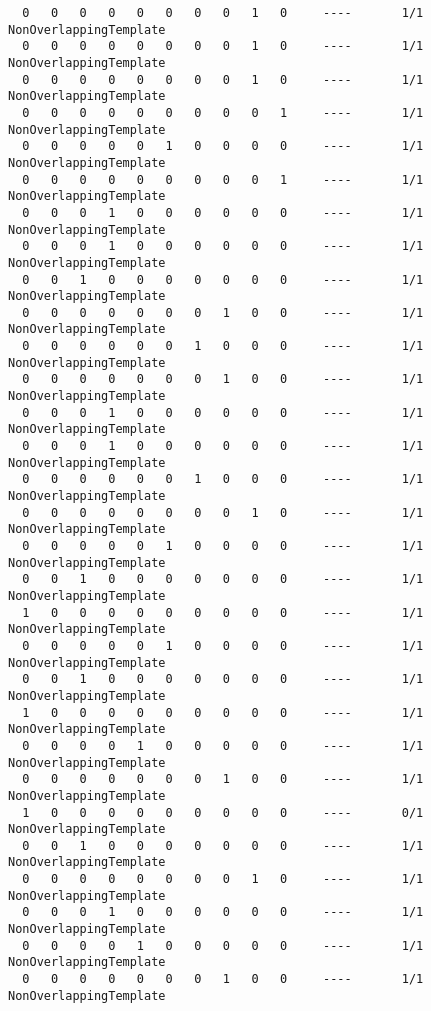 \begin{code}
\begin{verbatim}
  0   0   0   0   0   0   0   0   1   0     ----       1/1       NonOverlappingTemplate
  0   0   0   0   0   0   0   0   1   0     ----       1/1       NonOverlappingTemplate
  0   0   0   0   0   0   0   0   1   0     ----       1/1       NonOverlappingTemplate
  0   0   0   0   0   0   0   0   0   1     ----       1/1       NonOverlappingTemplate
  0   0   0   0   0   1   0   0   0   0     ----       1/1       NonOverlappingTemplate
  0   0   0   0   0   0   0   0   0   1     ----       1/1       NonOverlappingTemplate
  0   0   0   1   0   0   0   0   0   0     ----       1/1       NonOverlappingTemplate
  0   0   0   1   0   0   0   0   0   0     ----       1/1       NonOverlappingTemplate
  0   0   1   0   0   0   0   0   0   0     ----       1/1       NonOverlappingTemplate
  0   0   0   0   0   0   0   1   0   0     ----       1/1       NonOverlappingTemplate
  0   0   0   0   0   0   1   0   0   0     ----       1/1       NonOverlappingTemplate
  0   0   0   0   0   0   0   1   0   0     ----       1/1       NonOverlappingTemplate
  0   0   0   1   0   0   0   0   0   0     ----       1/1       NonOverlappingTemplate
  0   0   0   1   0   0   0   0   0   0     ----       1/1       NonOverlappingTemplate
  0   0   0   0   0   0   1   0   0   0     ----       1/1       NonOverlappingTemplate
  0   0   0   0   0   0   0   0   1   0     ----       1/1       NonOverlappingTemplate
  0   0   0   0   0   1   0   0   0   0     ----       1/1       NonOverlappingTemplate
  0   0   1   0   0   0   0   0   0   0     ----       1/1       NonOverlappingTemplate
  1   0   0   0   0   0   0   0   0   0     ----       1/1       NonOverlappingTemplate
  0   0   0   0   0   1   0   0   0   0     ----       1/1       NonOverlappingTemplate
  0   0   1   0   0   0   0   0   0   0     ----       1/1       NonOverlappingTemplate
  1   0   0   0   0   0   0   0   0   0     ----       1/1       NonOverlappingTemplate
  0   0   0   0   1   0   0   0   0   0     ----       1/1       NonOverlappingTemplate
  0   0   0   0   0   0   0   1   0   0     ----       1/1       NonOverlappingTemplate
  1   0   0   0   0   0   0   0   0   0     ----       0/1       NonOverlappingTemplate
  0   0   1   0   0   0   0   0   0   0     ----       1/1       NonOverlappingTemplate
  0   0   0   0   0   0   0   0   1   0     ----       1/1       NonOverlappingTemplate
  0   0   0   1   0   0   0   0   0   0     ----       1/1       NonOverlappingTemplate
  0   0   0   0   1   0   0   0   0   0     ----       1/1       NonOverlappingTemplate
  0   0   0   0   0   0   0   1   0   0     ----       1/1       NonOverlappingTemplate

\end{verbatim}
\end{code}
